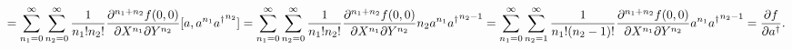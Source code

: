 \documentclass{minimal}
\begin{document}
\begin{dmath}
[a,f(a,a^\dagger)]
= \sum_{n_1=0}^{\infty} \sum_{n_2=0}^{\infty} \frac{1}{n_1! n_2!}
\frac{\partial^{n_1+n_2}f(0,0)}{\partial X^{n_1} \partial Y^{n_2}}
[a,a^{n_1} {a^\dagger}^{n_2}]
= \sum_{n_1=0}^{\infty} \sum_{n_2=0}^{\infty} \frac{1}{n_1! n_2!}
\frac{\partial^{n_1+n_2}f(0,0)}{\partial X^{n_1} \partial Y^{n_2}} n_2 a^{n_1} {a^\dagger}^{n_2-1}
= \sum_{n_1=0}^{\infty} \sum_{n_2=1}^{\infty} \frac{1}{n_1! (n_2-1)!}
\frac{\partial^{n_1+n_2}f(0,0)}{\partial X^{n_1} \partial Y^{n_2}} a^{n_1} {a^\dagger}^{n_2-1}
= \pdv{f}{a^\dagger}.
\end{dmath}
\end{document}
